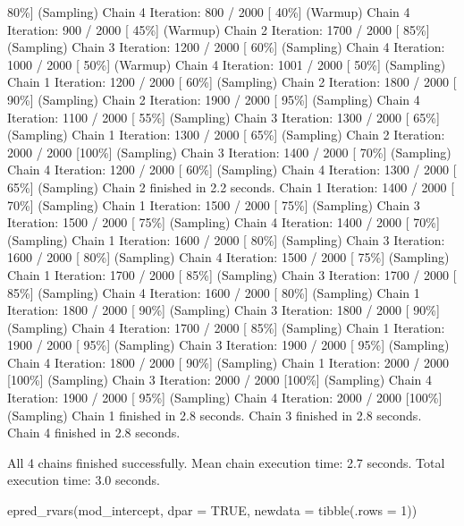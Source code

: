 \documentclass[
]{article}
\newenvironment{Shaded}{\begin{snugshade}}{\end{snugshade}}
\newcommand{\AttributeTok}[1]{\textcolor[rgb]{0.40,0.45,0.13}{#1}}
\newcommand{\ConstantTok}[1]{\textcolor[rgb]{0.56,0.35,0.01}{#1}}
\newcommand{\DecValTok}[1]{\textcolor[rgb]{0.68,0.00,0.00}{#1}}
\newcommand{\FunctionTok}[1]{\textcolor[rgb]{0.28,0.35,0.67}{#1}}
\newcommand{\NormalTok}[1]{\textcolor[rgb]{0.00,0.23,0.31}{#1}}
\begin{document}
80\%{]} (Sampling) Chain 4 Iteration: 800 / 2000 {[} 40\%{]} (Warmup)
Chain 4 Iteration: 900 / 2000 {[} 45\%{]} (Warmup) Chain 2 Iteration:
1700 / 2000 {[} 85\%{]} (Sampling) Chain 3 Iteration: 1200 / 2000 {[}
60\%{]} (Sampling) Chain 4 Iteration: 1000 / 2000 {[} 50\%{]} (Warmup)
Chain 4 Iteration: 1001 / 2000 {[} 50\%{]} (Sampling) Chain 1 Iteration:
1200 / 2000 {[} 60\%{]} (Sampling) Chain 2 Iteration: 1800 / 2000 {[}
90\%{]} (Sampling) Chain 2 Iteration: 1900 / 2000 {[} 95\%{]} (Sampling)
Chain 4 Iteration: 1100 / 2000 {[} 55\%{]} (Sampling) Chain 3 Iteration:
1300 / 2000 {[} 65\%{]} (Sampling) Chain 1 Iteration: 1300 / 2000 {[}
65\%{]} (Sampling) Chain 2 Iteration: 2000 / 2000 {[}100\%{]} (Sampling)
Chain 3 Iteration: 1400 / 2000 {[} 70\%{]} (Sampling) Chain 4 Iteration:
1200 / 2000 {[} 60\%{]} (Sampling) Chain 4 Iteration: 1300 / 2000 {[}
65\%{]} (Sampling) Chain 2 finished in 2.2 seconds. Chain 1 Iteration:
1400 / 2000 {[} 70\%{]} (Sampling) Chain 1 Iteration: 1500 / 2000 {[}
75\%{]} (Sampling) Chain 3 Iteration: 1500 / 2000 {[} 75\%{]} (Sampling)
Chain 4 Iteration: 1400 / 2000 {[} 70\%{]} (Sampling) Chain 1 Iteration:
1600 / 2000 {[} 80\%{]} (Sampling) Chain 3 Iteration: 1600 / 2000 {[}
80\%{]} (Sampling) Chain 4 Iteration: 1500 / 2000 {[} 75\%{]} (Sampling)
Chain 1 Iteration: 1700 / 2000 {[} 85\%{]} (Sampling) Chain 3 Iteration:
1700 / 2000 {[} 85\%{]} (Sampling) Chain 4 Iteration: 1600 / 2000 {[}
80\%{]} (Sampling) Chain 1 Iteration: 1800 / 2000 {[} 90\%{]} (Sampling)
Chain 3 Iteration: 1800 / 2000 {[} 90\%{]} (Sampling) Chain 4 Iteration:
1700 / 2000 {[} 85\%{]} (Sampling) Chain 1 Iteration: 1900 / 2000 {[}
95\%{]} (Sampling) Chain 3 Iteration: 1900 / 2000 {[} 95\%{]} (Sampling)
Chain 4 Iteration: 1800 / 2000 {[} 90\%{]} (Sampling) Chain 1 Iteration:
2000 / 2000 {[}100\%{]} (Sampling) Chain 3 Iteration: 2000 / 2000
{[}100\%{]} (Sampling) Chain 4 Iteration: 1900 / 2000 {[} 95\%{]}
(Sampling) Chain 4 Iteration: 2000 / 2000 {[}100\%{]} (Sampling) Chain 1
finished in 2.8 seconds. Chain 3 finished in 2.8 seconds. Chain 4
finished in 2.8 seconds.

All 4 chains finished successfully. Mean chain execution time: 2.7
seconds. Total execution time: 3.0 seconds.

\begin{Shaded}
\begin{Highlighting}[]
\FunctionTok{epred\_rvars}\NormalTok{(mod\_intercept, }
            \AttributeTok{dpar =} \ConstantTok{TRUE}\NormalTok{, }
            \AttributeTok{newdata =} \FunctionTok{tibble}\NormalTok{(}\AttributeTok{.rows =} \DecValTok{1}\NormalTok{))}
\end{Highlighting}
\end{Shaded}
\end{document}
